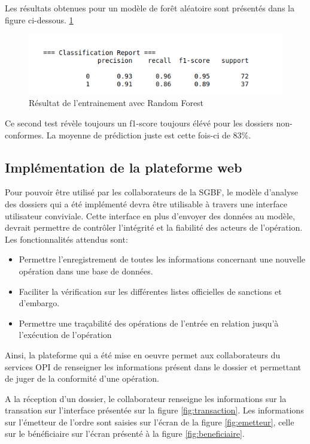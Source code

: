 Les résultats obtenues pour un modèle de forêt aléatoire sont présentés dans la 
figure ci-dessous. \ref{fig:randomresult}
 \begin{figure}[h!]
  \begin{center}
    \includegraphics[width=14cm]{images/randomresult.png}
    \caption{Résultat de l'entrainement avec Random
    Forest\label{fig:randomresult}}
  \end{center}
\end{figure}

Ce second test révèle toujours un f1-score toujours  élévé pour les dossiers
non-conformes. La moyenne de prédiction juste est cette fois-ci de 83\%. 

\subsection{Implémentation de la plateforme web}

Pour pouvoir être utilisé par les collaborateurs de la SGBF, le modèle d'analyse
des dossiers qui a été implémenté devra être utilisable à travers une interface
utilisateur conviviale. 
Cette interface en plus d'envoyer des données au modèle, devrait permettre de
contrôler l'intégrité et la fiabilité des acteurs de l'opération. Les
fonctionnalités attendus sont:
\begin{itemize}
  \item Permettre l'enregistrement de toutes les informations concernant une
    nouvelle opération dans une base de données.
  \item Faciliter la vérification sur les différentes listes officielles de
    sanctions et d'embargo.
  \item Permettre une traçabilité des opérations de l'entrée en relation
    jusqu'à l'exécution de l'opération
\end{itemize}

Ainsi, la plateforme qui a été mise en oeuvre permet aux collaborateurs du services 
OPI de renseigner les informations présent dans le dossier et permettant de 
juger de la conformité d'une opération.

A la réception d'un dossier, le collaborateur renseigne les informations sur la
transation sur l'interface présentée sur la figure \ref{fig:transaction}. Les
informations sur l'émetteur de l'ordre sont saisies sur l'écran de la figure \ref{fig:emetteur},
celle sur le bénéficiaire sur l'écran présenté à la figure \ref{fig:beneficiaire}.

